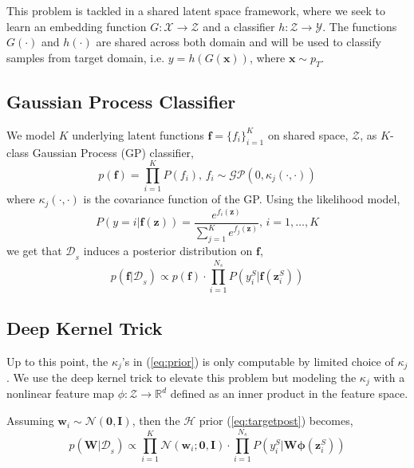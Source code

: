 \documentclass[10pt,twocolumn,letterpaper]{article}
\newcommand{\vect}[1]{\boldsymbol{\mathbf{#1}}}
\begin{document}
This problem is tackled in a shared latent space framework, where we seek to learn an embedding function \(G: \mathcal{X} \to \mathcal{Z}\) and a classifier \(h: \mathcal{Z} \to \mathcal{Y}\).
The functions \(G(\cdot)\) and \(h(\cdot)\) are shared across both domain and will be used to classify samples from target domain, i.e. \(y = h(G(\vect{x}))\), where \(\vect{x} \sim p_T\).

\subsection{Gaussian Process Classifier}
We model \(K\) underlying latent functions \(\vect{f} = \{f_i\}_{i=1}^{K}\) on shared space, \(\mathcal{Z}\), as \(K\)-class Gaussian Process (GP) classifier, 
    \begin{equation} \label{eq:prior}
        p(\vect{f}) = \prod_{i=1}^{K}P(f_i), \, f_i \sim \mathcal{GP}\left(0, \kappa_j(\cdot,\cdot)\right)
    \end{equation}
where \(\kappa_j(\cdot,\cdot)\) is the covariance function of the GP. Using the likelihood model,
    \begin{equation} \label{eq:likfunc}
        P(y=i | \vect{f}(\vect{z})) = \frac{e^{f_i(\vect{z})}}{\sum_{j=1}^{K}e^{f_j(\vect{z})}}, \, i = 1,\dots,K
    \end{equation}
we get that \(\mathcal{D}_{_{S}}\) induces a posterior distribution on \(\vect{f}\),
    \begin{equation} \label{eq:targetpost}
        p(\vect{f}|\mathcal{D}_{_{S}}) \propto p(\vect{f}) \cdot \prod_{i=1}^{N_s} P(y_i^{S} | \vect{f}(\vect{z}_i^{S}))
    \end{equation}

\subsection{Deep Kernel Trick}
Up to this point, the \(\kappa_j\)'s in (\ref{eq:prior}) is only computable by limited choice of \(\kappa_j\). 
We use the deep kernel trick to elevate this problem but modeling the \(\kappa_j\) with a nonlinear feature map \(\phi: \mathcal{Z} \to \mathbb{R}^d\) defined as an inner product in the feature space.

Assuming \(\vect{w}_i \sim \mathcal{N}(\vect{0}, \vect{I})\), then the \(\mathcal{H}\) prior (\ref{eq:targetpost}) becomes,
    \begin{equation}
        p(\vect{W}|\mathcal{D}_{_{S}}) \propto \prod_{i=1}^{K}\mathcal{N}(\vect{w}_i ; \vect{0}, \vect{I}) \cdot \prod_{i=1}^{N_s} P(y_i^{S} | \vect{W \phi}(\vect{z}_i^{S}))
    \end{equation}
    
\end{document}
